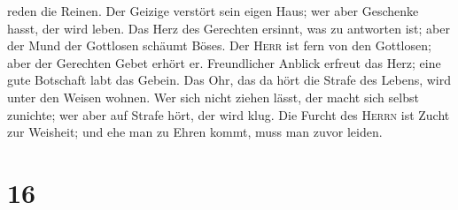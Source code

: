reden die Reinen.  Der Geizige verstört sein eigen Haus;
wer aber Geschenke hasst, der wird leben.  Das Herz des
Gerechten ersinnt, was zu antworten ist; aber der Mund der Gottlosen
schäumt Böses.  Der \textsc{Herr} ist fern von den
Gottlosen; aber der Gerechten Gebet erhört er. 
Freundlicher Anblick erfreut das Herz; eine gute Botschaft labt das
Gebein.  Das Ohr, das da hört die Strafe des Lebens, wird
unter den Weisen wohnen.  Wer sich nicht ziehen lässt,
der macht sich selbst zunichte; wer aber auf Strafe hört, der wird klug.
 Die Furcht des \textsc{Herrn} ist Zucht zur Weisheit;
und ehe man zu Ehren kommt, muss man zuvor leiden.

\hypertarget{section-15}{%
\section{16}\label{section-15}}

